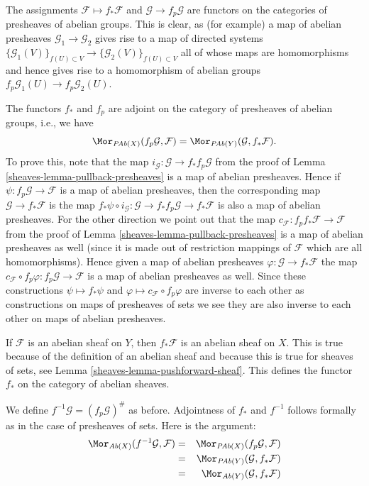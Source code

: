 \medskip\noindent
The assignments $\mathcal{F} \mapsto f_*\mathcal{F}$ and
$\mathcal{G} \to f_p\mathcal{G}$ are functors on
the categories of presheaves of abelian groups.
This is clear, as (for example) a map of abelian presheaves
$\mathcal{G}_1 \to \mathcal{G}_2$ gives rise to a map of
directed systems
$\{\mathcal{G}_1(V)\}_{f(U) \subset V} \to
\{\mathcal{G}_2(V)\}_{f(U) \subset V}$
all of whose maps are homomorphisms
and hence gives rise to a homomorphism of abelian groups
$f_p\mathcal{G}_1(U) \to f_p\mathcal{G}_2(U)$.

\medskip\noindent
The functors $f_*$ and $f_p$ are adjoint on the
category of presheaves of abelian groups, i.e., we have
$$
\Mor_{\textit{PAb}(X)}(f_p\mathcal{G}, \mathcal{F})
=
\Mor_{\textit{PAb}(Y)}(\mathcal{G}, f_*\mathcal{F}).
$$
To prove this, note that the map
$i_\mathcal{G} : \mathcal{G} \to f_* f_p\mathcal{G}$ from the proof
of Lemma \ref{sheaves-lemma-pullback-presheaves}
is a map of abelian presheaves. Hence if
$\psi : f_p\mathcal{G} \to \mathcal{F}$
is a map of abelian presheaves, then the corresponding map
$\mathcal{G} \to f_*\mathcal{F}$ is the map
$f_*\psi \circ i_\mathcal{G} :
\mathcal{G} \to f_* f_p \mathcal{G} \to f_* \mathcal{F}$
is also a map of abelian presheaves. For the other direction
we point out that the map
$c_\mathcal{F} : f_p f_* \mathcal{F} \to \mathcal{F}$
from the proof of Lemma \ref{sheaves-lemma-pullback-presheaves} is a
map of abelian presheaves as well (since it is made out of restriction
mappings of $\mathcal{F}$ which are all homomorphisms). Hence
given a map of abelian presheaves $\varphi : \mathcal{G} \to f_*\mathcal{F}$
the map
$c_\mathcal{F} \circ f_p\varphi : f_p\mathcal{G} \to \mathcal{F}$
is a map of abelian presheaves as well. Since these constructions
$\psi \mapsto f_*\psi$ and $\varphi \mapsto c_\mathcal{F} \circ f_p\varphi$
are inverse to each other as constructions on maps of presheaves of sets
we see they are also inverse to each other on maps of abelian presheaves.

\medskip\noindent
If $\mathcal{F}$ is an abelian sheaf on $Y$, then $f_*\mathcal{F}$
is an abelian sheaf on $X$. This is true because of the definition
of an abelian sheaf and because this is true for sheaves of sets,
see Lemma \ref{sheaves-lemma-pushforward-sheaf}. This defines the functor
$f_*$ on the category of abelian sheaves.

\medskip\noindent
We define $f^{-1}\mathcal{G} = (f_p\mathcal{G})^\#$ as before.
Adjointness of $f_*$ and $f^{-1}$ follows formally as in
the case of presheaves of sets. Here is the argument:
\begin{eqnarray*}
\Mor_{\textit{Ab}(X)}(f^{-1}\mathcal{G}, \mathcal{F})
& = &
\Mor_{\textit{PAb}(X)}(f_p\mathcal{G}, \mathcal{F}) \\
& = &
\Mor_{\textit{PAb}(Y)}(\mathcal{G}, f_*\mathcal{F}) \\
& = &
\Mor_{\textit{Ab}(Y)}(\mathcal{G}, f_*\mathcal{F})
\end{eqnarray*}


